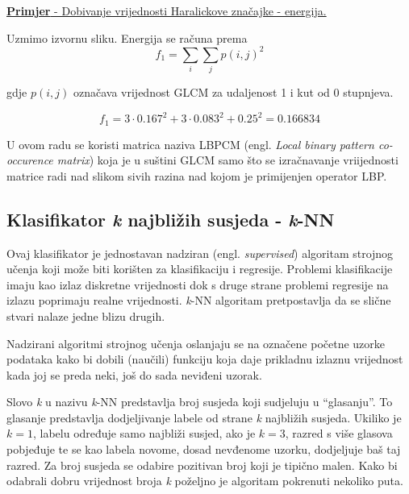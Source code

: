 \documentclass[times, utf8, zavrsni, numeric]{fer}
\begin{document}
\bigbreak

\underline{\textbf{Primjer} - Dobivanje vrijednosti Haralickove značajke - energija.}

\bigbreak

Uzmimo izvornu sliku. Energija se računa prema
\[
f_1 = \sum_{i}\sum_{j}p(i,j)^2
\]

gdje \(p(i,j)\) označava vrijednost GLCM za udaljenost 1 i kut od 0 stupnjeva.

\[
f_1 = 3 \cdot 0.167^2 + 3 \cdot 0.083^2 + 0.25^2 = 0.166834
\]

U ovom radu se koristi matrica naziva LBPCM (engl. \textit{Local binary pattern co-occurence matrix})
koja je u suštini GLCM samo što se izračnavanje vriijednosti matrice 
radi nad slikom sivih razina nad kojom je primijenjen operator LBP.

\newpage

\subsection{Klasifikator \textit{k} najbližih susjeda - \textit{k}-NN}

Ovaj klasifikator je jednostavan nadziran (engl. \textit{supervised})
algoritam strojnog učenja koji može biti korišten za klasifikaciju
i regresije. Problemi klasifikacije imaju kao izlaz diskretne vrijednosti
dok s druge strane problemi regresije na izlazu poprimaju realne vrijednosti.
\textit{k}-NN algoritam pretpostavlja da se slične stvari nalaze 
jedne blizu drugih.

\bigbreak

Nadzirani algoritmi strojnog učenja oslanjaju se na označene početne uzorke
podataka kako bi dobili (naučili) funkciju koja daje prikladnu izlaznu vrijednost
kada joj se preda neki, još do sada neviđeni uzorak. 

\bigbreak

Slovo \textit{k} u nazivu \textit{k}-NN predstavlja broj susjeda koji sudjeluju
u \enquote{glasanju}. To glasanje predstavlja dodjeljivanje labele od strane \textit{k}
najbližih susjeda. Ukiliko je \(k=1\), labelu određuje samo najbliži susjed,
ako je \(k=3\), razred s više glasova pobjeđuje te se kao labela novome, dosad
nevđenome uzorku, dodjeljuje baš taj razred. Za broj susjeda se odabire pozitivan
broj koji je tipično malen. Kako bi odabrali dobru vrijednost broja \textit{k} poželjno
je algoritam pokrenuti nekoliko puta. 
\end{document}
